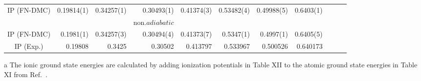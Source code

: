 \begin{table*}[t!]
\begin{threeparttable}
\begin{tabular*}{\textwidth}{@{\extracolsep{\fill}} c*{10}{D{.}{.}{6}} }
IP (FN-DMC) & 0.19814(1) & 0.34257(1) & 0.30493(1) & 0.41374(3) & 0.53482(4) & 0.49988(5) & 0.6403(1) \\
&&&non.$adiabatic$&&&& \\
IP (FN-DMC) & 0.1981(1) & 0.34257(3) & 0.30494(4) & 0.41373(7) & 0.5347(1) & 0.4997(1) & 0.6405(5) \\
IP (Exp.) \cite{CCCBDB} & 0.19808 & 0.3425 & 0.30502 & 0.413797 & 0.533967 & 0.500526 & 0.640173 \\
\hline\hline
\end{tabular*}
\begin{tablenotes}
\item[a] The ionic ground state energies are calculated by adding ionization potentials in Table XII to the atomic ground state energies in Table XI from Ref.~\cite{Davidson_Atoms}.
\end{tablenotes}
\end{threeparttable}
\end{table*}